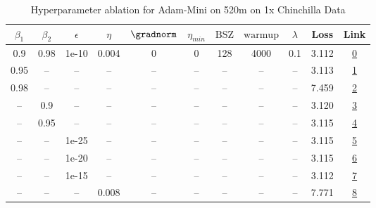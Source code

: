 \begin{table}[H]
\centering
\caption{Hyperparameter ablation for Adam-Mini on 520m on 1x Chinchilla Data}
\label{tab:ablation_adam-mini_520m_on_1x_chinchilla_data}
\begin{tabular}{ccccccccccc}
\toprule
$\beta_1$ & $\beta_2$ & $\epsilon$ & $\eta$ & $\gradnorm$ & $\eta_{min}$ & $\mathrm{BSZ}$ & $\mathrm{warmup}$ & $\lambda$ & Loss & Link \\
\midrule
0.9 & 0.98 & 1e-10 & 0.004 & 0 & 0 & 128 & 4000 & 0.1 & 3.112 & \href{https://wandb.ai/stanford-mercury/optimizer-scaling/runs/sweep-520m-10B-mini9187d7lr0.004-wd0.1-minlr0-warmup4000-b10.9-b-398e5f}{0} \\
\midrule
0.95 & -- & -- & -- & -- & -- & -- & -- & -- & 3.113 & \href{https://wandb.ai/stanford-mercury/optimizer-scaling/runs/sweep-520m-10B-minic83515lr0.004-wd0.1-minlr0-warmup4000-b10.95--2b99be}{1} \\
0.98 & -- & -- & -- & -- & -- & -- & -- & -- & 7.459 & \href{https://wandb.ai/stanford-mercury/optimizer-scaling/runs/sweep-520m-10B-mini61f7e6lr0.004-wd0.1-minlr0-warmup4000-b10.98--c8aa3c}{2} \\
-- & 0.9 & -- & -- & -- & -- & -- & -- & -- & 3.120 & \href{https://wandb.ai/stanford-mercury/optimizer-scaling/runs/sweep-520m-10B-minib059b0lr0.004-wd0.1-minlr0-warmup4000-b10.9-b-ef048a}{3} \\
-- & 0.95 & -- & -- & -- & -- & -- & -- & -- & 3.115 & \href{https://wandb.ai/stanford-mercury/optimizer-scaling/runs/sweep-520m-10B-minid80005lr0.004-wd0.1-minlr0-warmup4000-b10.9-b-4d59a5}{4} \\
-- & -- & 1e-25 & -- & -- & -- & -- & -- & -- & 3.115 & \href{https://wandb.ai/stanford-mercury/optimizer-scaling/runs/sweep-520m-10B-mini030aa2lr0.004-wd0.1-minlr0-warmup4000-b10.9-b-e031a9}{5} \\
-- & -- & 1e-20 & -- & -- & -- & -- & -- & -- & 3.115 & \href{https://wandb.ai/stanford-mercury/optimizer-scaling/runs/sweep-520m-10B-miniad4882lr0.004-wd0.1-minlr0-warmup4000-b10.9-b-375106}{6} \\
-- & -- & 1e-15 & -- & -- & -- & -- & -- & -- & 3.112 & \href{https://wandb.ai/stanford-mercury/optimizer-scaling/runs/sweep-520m-10B-minica5e495lr0.004-wd0.1-minlr0-warmup4000-b10.9--791457}{7} \\
-- & -- & -- & 0.008 & -- & -- & -- & -- & -- & 7.771 & \href{https://wandb.ai/stanford-mercury/optimizer-scaling/runs/sweep-520m-10B-mini8213c6lr0.008-wd0.1-minlr0-warmup4000-b10.9-b-cea98b}{8} \\

\end{tabular}
\end{table}
